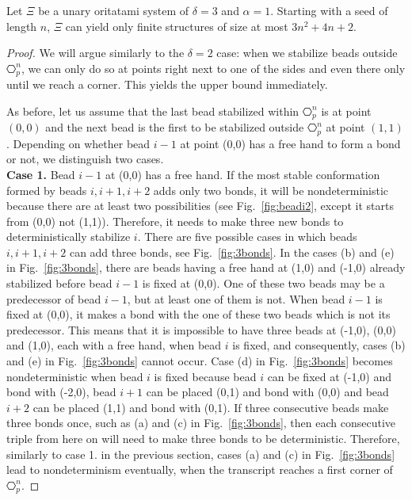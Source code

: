 \begin{lemma}[$\delta=3, \alpha =1$]\label{lem:d3a1}
	Let $\Xi$ be a unary oritatami system of $\delta=3$ and $\alpha = 1$. Starting with a seed of length $n$, $\Xi$ can yield only finite structures of size at most $3n^2+4n+2$.
\end{lemma}
\begin{proof}
We will argue similarly to the $\delta=2$ case: when we stabilize beads outside $\hexagon_p^n$, we can only do so at points right next to one of the sides and even there only until we reach a corner. This yields the upper bound immediately.

As before, let us assume that the last bead stabilized within $\hexagon_p^n$ is at point $(0,0)$ and the next bead is the first to be stabilized outside $\hexagon_p^n$ at point $(1,1)$. Depending on whether bead $i-1$ at point (0,0) has a free hand to form a bond or not, we distinguish two cases.\\
\noindent\textbf{Case 1.}  Bead $i-1$ at (0,0) has a free hand. If the most stable conformation formed by beads $i, i+1, i+2$ adds only two  bonds, it will be nondeterministic because there are at least two possibilities (see Fig.~\ref{fig:beadi2}, except it starts from (0,0) not (1,1)). Therefore, it needs to make three new bonds to deterministically stabilize $i$. There are five possible cases in which beads $i, i+1, i+2$ can add three bonds, see Fig.~\ref{fig:3bonds}. In the cases (b) and (e) in Fig.~\ref{fig:3bonds}, there are beads having a free hand at (1,0) and (-1,0) already stabilized before bead $i-1$ is fixed at (0,0). One of these two beads may be a predecessor of bead $i-1$, but at least one of them is not. When bead $i-1$ is fixed at (0,0), it makes a bond with the one of these two beads which is not its predecessor. This means that it is impossible to have three beads at (-1,0), (0,0) and (1,0), each with a free hand, when bead $i$ is fixed, and consequently, cases (b) and (e) in Fig.~\ref{fig:3bonds} cannot occur. Case (d) in Fig.~\ref{fig:3bonds} becomes nondeterministic when bead $i$ is fixed because bead $i$ can be fixed at (-1,0) and bond with (-2,0), bead $i+1$ can be placed (0,1) and bond with (0,0) and bead $i+2$ can be placed (1,1) and bond with (0,1). If three consecutive beads make three bonds once, such as (a) and (c) in Fig.~\ref{fig:3bonds}, then each consecutive triple from here on will need to make three bonds to be deterministic. Therefore, similarly to case 1. in the previous section, cases (a) and (c) in Fig.~\ref{fig:3bonds} lead to nondeterminism eventually, when the transcript reaches a first corner of $\hexagon_p^n$.


\end{proof}
